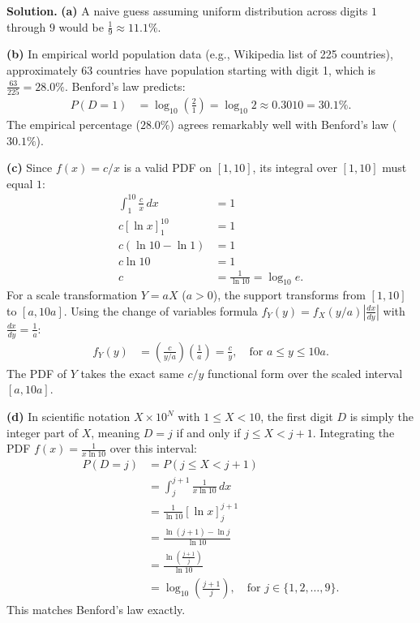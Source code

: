 \documentclass[11pt,a4paper]{article}
\begin{document}
\noindent \textbf{Solution.} \textbf{(a)} A naive guess assuming uniform distribution across digits $1$ through $9$ would be $\frac{1}{9} \approx 11.1\%$.

\vspace{4pt}
\noindent \textbf{(b)} In empirical world population data (e.g., Wikipedia list of 225 countries), approximately 63 countries have population starting with digit 1, which is $\frac{63}{225} = 28.0\%$. Benford's law predicts:
\begin{align*}
P(D = 1) &= \log_{10}\left(\frac{2}{1}\right) = \log_{10} 2 \approx 0.3010 = 30.1\%.
\end{align*}
The empirical percentage ($28.0\%$) agrees remarkably well with Benford's law ($30.1\%$).

\vspace{4pt}
\noindent \textbf{(c)} Since $f(x) = c/x$ is a valid PDF on $[1, 10]$, its integral over $[1, 10]$ must equal $1$:
\begin{align*}
\int_{1}^{10} \frac{c}{x} \, dx &= 1 \\
c [ \ln x ]_{1}^{10} &= 1 \\
c (\ln 10 - \ln 1) &= 1 \\
c \ln 10 &= 1 \\
c &= \frac{1}{\ln 10} = \log_{10} e.
\end{align*}
For a scale transformation $Y = aX$ ($a > 0$), the support transforms from $[1, 10]$ to $[a, 10a]$. Using the change of variables formula $f_Y(y) = f_X(y/a) \left| \frac{dx}{dy} \right|$ with $\frac{dx}{dy} = \frac{1}{a}$:
\begin{align*}
f_Y(y) &= \left( \frac{c}{y/a} \right) \left( \frac{1}{a} \right) = \frac{c}{y}, \quad \text{for } a \le y \le 10a.
\end{align*}
The PDF of $Y$ takes the exact same $c/y$ functional form over the scaled interval $[a, 10a]$.

\vspace{4pt}
\noindent \textbf{(d)} In scientific notation $X \times 10^N$ with $1 \le X < 10$, the first digit $D$ is simply the integer part of $X$, meaning $D = j$ if and only if $j \le X < j + 1$. Integrating the PDF $f(x) = \frac{1}{x \ln 10}$ over this interval:
\begin{align*}
P(D = j) &= P(j \le X < j + 1) \\
&= \int_{j}^{j+1} \frac{1}{x \ln 10} \, dx \\
&= \frac{1}{\ln 10} [ \ln x ]_{j}^{j+1} \\
&= \frac{\ln(j + 1) - \ln j}{\ln 10} \\
&= \frac{\ln\left(\frac{j+1}{j}\right)}{\ln 10} \\
&= \log_{10}\left(\frac{j+1}{j}\right), \quad \text{for } j \in \{1, 2, \dots, 9\}.
\end{align*}
This matches Benford's law exactly.
\end{document}
